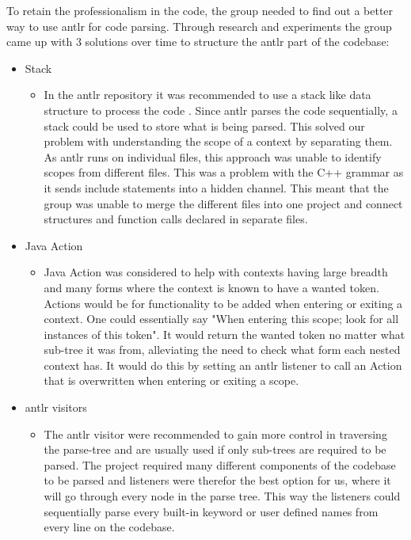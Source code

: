 To retain the professionalism in the code, the group needed to find out a better way to use \gls{antlr} for code parsing. Through research and experiments the group came up with 3 solutions over time to structure the \gls{antlr} part of the codebase:
\begin{itemize}
    \item Stack
    \begin{itemize}
        \item In the \gls{antlr} repository it was recommended to use a stack like data structure to process the code \cite{github:stackAntlr}. Since \gls{antlr} parses the code sequentially, a stack could be used to store what is being parsed. This solved our problem with understanding the scope of a context by separating them. As \gls{antlr} runs on individual files, this approach was unable to identify scopes from different files. This was a problem with the C++ grammar as it sends include statements into a hidden channel. This meant that the group was unable to merge the different files into one project and connect structures and function calls declared in separate files.
    \end{itemize}

    \item Java Action
    \begin{itemize}
        \item Java Action was considered to help with contexts having large breadth and many forms where the context is known to have a wanted token. Actions would be for functionality to be added when entering or exiting a context. One could essentially say "When entering this scope; look for all instances of this token". It would return the wanted token no matter what sub-tree it was from, alleviating the need to check what form each nested context has. It would do this by setting an \gls{antlr} listener to call an Action that is overwritten when entering or exiting a scope.
    \end{itemize}

    \item \gls{antlr} visitors 
    \begin{itemize}
        \item The \gls{antlr} visitor were recommended to gain more control in traversing the parse-tree and are usually used if only sub-trees are required to be parsed. The project required many different components of the codebase to be parsed and listeners were therefor the best option for us, where it will go through every node in the parse tree. This way the listeners could sequentially parse every built-in keyword or user defined names from every line on the codebase.
    \end{itemize}
\end{itemize}

